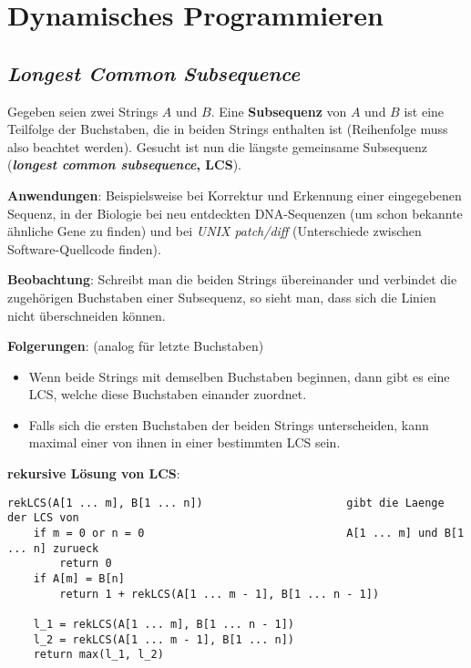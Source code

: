 \chapter{%
    Dynamisches Programmieren%
}

\section{%
    \emph{Longest Common Subsequence}%
}

Gegeben seien zwei Strings $A$ und $B$.
Eine \textbf{Subsequenz} von $A$ und $B$ ist eine Teilfolge der Buchstaben, die
in beiden Strings enthalten ist (Reihenfolge muss also beachtet werden).
Gesucht ist nun die längste gemeinsame Subsequenz
(\textbf{\emph{longest common subsequence}, LCS}).

\textbf{Anwendungen}:
Beispielsweise bei Korrektur und Erkennung einer eingegebenen Sequenz,
in der Biologie bei neu entdeckten DNA-Sequenzen (um schon bekannte ähnliche
Gene zu finden) und bei \emph{UNIX patch/diff}
(Unterschiede zwischen Software-Quellcode finden).

\linie

\textbf{Beobachtung}:
Schreibt man die beiden Strings übereinander und verbindet die zugehörigen
Buchstaben einer Subsequenz, so sieht man, dass sich die Linien nicht
überschneiden können.

\textbf{Folgerungen}:
(analog für letzte Buchstaben)
\begin{itemize}
    \item
    Wenn beide Strings mit demselben Buchstaben beginnen, dann gibt es eine
    LCS, welche diese Buchstaben einander zuordnet.

    \item
    Falls sich die ersten Buchstaben der beiden Strings unterscheiden,
    kann maximal einer von ihnen in einer bestimmten LCS sein.
\end{itemize}

\linie

\textbf{rekursive Lösung von LCS}:
\begin{lstlisting}
rekLCS(A[1 ... m], B[1 ... n])                      gibt die Laenge der LCS von
    if m = 0 or n = 0                               A[1 ... m] und B[1 ... n] zurueck
        return 0
    if A[m] = B[n]
        return 1 + rekLCS(A[1 ... m - 1], B[1 ... n - 1])

    l_1 = rekLCS(A[1 ... m], B[1 ... n - 1])
    l_2 = rekLCS(A[1 ... m - 1], B[1 ... n])
    return max(l_1, l_2)
\end{lstlisting}

